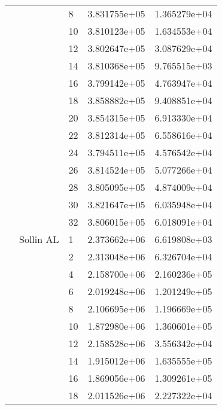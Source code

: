 \begin{tabular}{lllrr}
                      &            & 8  &  3.831755e+05 &  1.365279e+04 \\
                      &            & 10 &  3.810123e+05 &  1.634553e+04 \\
                      &            & 12 &  3.802647e+05 &  3.087629e+04 \\
                      &            & 14 &  3.810368e+05 &  9.765515e+03 \\
                      &            & 16 &  3.799142e+05 &  4.763947e+04 \\
                      &            & 18 &  3.858882e+05 &  9.408851e+04 \\
                      &            & 20 &  3.854315e+05 &  6.913330e+04 \\
                      &            & 22 &  3.812314e+05 &  6.558616e+04 \\
                      &            & 24 &  3.794511e+05 &  4.576542e+04 \\
                      &            & 26 &  3.814524e+05 &  5.077266e+04 \\
                      &            & 28 &  3.805095e+05 &  4.874009e+04 \\
                      &            & 30 &  3.821647e+05 &  6.035948e+04 \\
                      &            & 32 &  3.806015e+05 &  6.018091e+04 \\
                      & Sollin AL & 1  &  2.373662e+06 &  6.619808e+03 \\
                      &            & 2  &  2.313048e+06 &  6.326704e+04 \\
                      &            & 4  &  2.158700e+06 &  2.160236e+05 \\
                      &            & 6  &  2.019248e+06 &  1.201249e+05 \\
                      &            & 8  &  2.106695e+06 &  1.196669e+05 \\
                      &            & 10 &  1.872980e+06 &  1.360601e+05 \\
                      &            & 12 &  2.158528e+06 &  3.556342e+04 \\
                      &            & 14 &  1.915012e+06 &  1.635555e+05 \\
                      &            & 16 &  1.869056e+06 &  1.309261e+05 \\
                      &            & 18 &  2.011526e+06 &  2.227322e+04 \\

\end{tabular}

